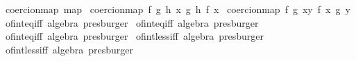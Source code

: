 \begin{isabellebody}
\isanewline
\isanewline
{}\isamarkupfalse%
\ {\isacharbrackleft}{\kern0pt}{\isacharbrackleft}{\kern0pt}coercion{\isacharunderscore}{\kern0pt}map\ map{\isacharbrackright}{\kern0pt}{\isacharbrackright}{\kern0pt}\isanewline
{}\isamarkupfalse%
\ {\isacharbrackleft}{\kern0pt}{\isacharbrackleft}{\kern0pt}coercion{\isacharunderscore}{\kern0pt}map\ {\isachardoublequoteopen}{\isasymlambda}f\ g\ h\ x{\isachardot}{\kern0pt}\ g\ {\isacharparenleft}{\kern0pt}h\ {\isacharparenleft}{\kern0pt}f\ x{\isacharparenright}{\kern0pt}{\isacharparenright}{\kern0pt}{\isachardoublequoteclose}{\isacharbrackright}{\kern0pt}{\isacharbrackright}{\kern0pt}\isanewline
{}\isamarkupfalse%
\ {\isacharbrackleft}{\kern0pt}{\isacharbrackleft}{\kern0pt}coercion{\isacharunderscore}{\kern0pt}map\ {\isachardoublequoteopen}{\isasymlambda}f\ g\ {\isacharparenleft}{\kern0pt}x{\isacharcomma}{\kern0pt}y{\isacharparenright}{\kern0pt}{\isachardot}{\kern0pt}\ {\isacharparenleft}{\kern0pt}f\ x{\isacharcomma}{\kern0pt}\ g\ y{\isacharparenright}{\kern0pt}{\isachardoublequoteclose}{\isacharbrackright}{\kern0pt}{\isacharbrackright}{\kern0pt}\isanewline
\isanewline
{}\isamarkupfalse%
\ of{\isacharunderscore}{\kern0pt}int{\isacharunderscore}{\kern0pt}eq{\isacharunderscore}{\kern0pt}{}{\isacharunderscore}{\kern0pt}iff\ {\isacharbrackleft}{\kern0pt}algebra{\isacharcomma}{\kern0pt}\ presburger{\isacharbrackright}{\kern0pt}\isanewline
{}\isamarkupfalse%
\ of{\isacharunderscore}{\kern0pt}int{\isacharunderscore}{\kern0pt}eq{\isacharunderscore}{\kern0pt}{}{\isacharunderscore}{\kern0pt}iff\ {\isacharbrackleft}{\kern0pt}algebra{\isacharcomma}{\kern0pt}\ presburger{\isacharbrackright}{\kern0pt}\isanewline
{}\isamarkupfalse%
\ of{\isacharunderscore}{\kern0pt}int{\isacharunderscore}{\kern0pt}eq{\isacharunderscore}{\kern0pt}iff\ {\isacharbrackleft}{\kern0pt}algebra{\isacharcomma}{\kern0pt}\ presburger{\isacharbrackright}{\kern0pt}\isanewline
{}\isamarkupfalse%
\ of{\isacharunderscore}{\kern0pt}int{\isacharunderscore}{\kern0pt}less{\isacharunderscore}{\kern0pt}{}{\isacharunderscore}{\kern0pt}iff\ {\isacharbrackleft}{\kern0pt}algebra{\isacharcomma}{\kern0pt}\ presburger{\isacharbrackright}{\kern0pt}\isanewline
{}\isamarkupfalse%
\ of{\isacharunderscore}{\kern0pt}int{\isacharunderscore}{\kern0pt}less{\isacharunderscore}{\kern0pt}{}{\isacharunderscore}{\kern0pt}iff\ {\isacharbrackleft}{\kern0pt}algebra{\isacharcomma}{\kern0pt}\ presburger{\isacharbrackright}{\kern0pt}\isanewline

\end{isabellebody}
